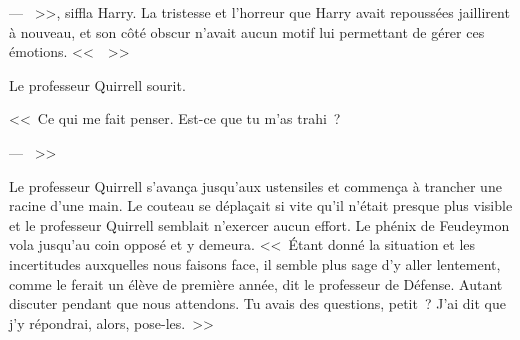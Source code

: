 --- ~>>, siffla Harry. La tristesse et l'horreur que Harry avait repoussées jaillirent à nouveau, et son côté obscur n'avait aucun motif lui permettant de gérer ces émotions. <<~~>>

Le professeur Quirrell sourit.

<<~Ce qui me fait penser. Est-ce que tu m'as trahi~?

--- ~>>

Le professeur Quirrell s'avança jusqu'aux ustensiles et commença à trancher une racine d'une main. Le couteau se déplaçait si vite qu'il n'était presque plus visible et le professeur Quirrell semblait n'exercer aucun effort. Le phénix de Feudeymon vola jusqu'au coin opposé et y demeura. <<~Étant donné la situation et les incertitudes auxquelles nous faisons face, il semble plus sage d'y aller lentement, comme le ferait un élève de première année, dit le professeur de Défense. Autant discuter pendant que nous attendons. Tu avais des questions, petit~? J'ai dit que j'y répondrai, alors, pose-les.~>> 

